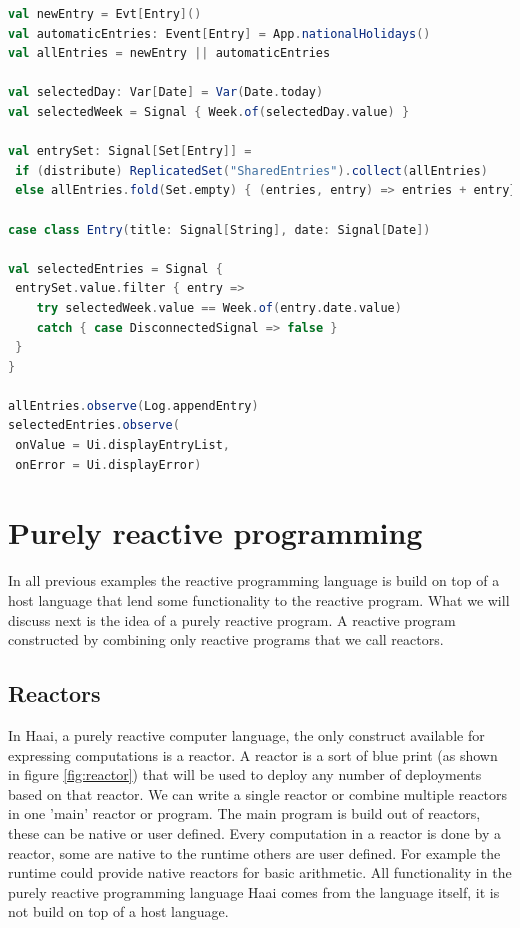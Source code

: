 \documentclass[a4paper]{book}
\begin{document}
\begin{lstlisting}[language=Scala, caption={REScala, shared calendar application},captionpos=b, label={code:rescala}, basicstyle=\small\ttfamily, frame=single]
val newEntry = Evt[Entry]()
val automaticEntries: Event[Entry] = App.nationalHolidays() 
val allEntries = newEntry || automaticEntries 

val selectedDay: Var[Date] = Var(Date.today) 
val selectedWeek = Signal { Week.of(selectedDay.value) } 

val entrySet: Signal[Set[Entry]] = 
 if (distribute) ReplicatedSet("SharedEntries").collect(allEntries)
 else allEntries.fold(Set.empty) { (entries, entry) => entries + entry}

case class Entry(title: Signal[String], date: Signal[Date]) 

val selectedEntries = Signal {
 entrySet.value.filter { entry => 
 	try selectedWeek.value == Week.of(entry.date.value)
 	catch { case DisconnectedSignal => false } 
 } 
} 

allEntries.observe(Log.appendEntry)
selectedEntries.observe(
 onValue = Ui.displayEntryList, 
 onError = Ui.displayError)
\end{lstlisting}


\section{Purely reactive programming} \label{sec:prp}
In all previous examples the reactive programming language is build on top of a host language that lend some functionality to the reactive program. What we will discuss next is the idea of a purely reactive program. A reactive program constructed by combining only reactive programs that we call reactors.
\subsection{Reactors}
In Haai, a purely reactive computer language, the only construct available for expressing computations is a reactor. A reactor is a sort of blue print (as shown in figure \ref{fig:reactor}) that will be used to deploy any number of deployments based on that reactor. We can write a single reactor or combine multiple reactors in one 'main' reactor or program. The main program is build out of reactors, these can be native or user defined. Every computation in a reactor is done by a reactor, some are native to the runtime others are user defined. For example the runtime could provide native reactors for basic arithmetic. All functionality in the purely reactive programming language Haai comes from the language itself, it is not build on top of a host language. 
\end{document}

